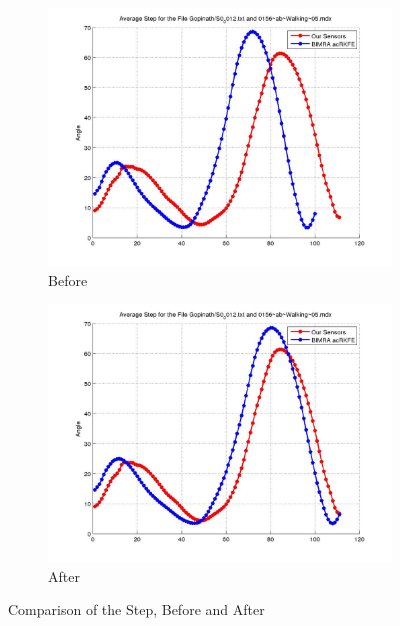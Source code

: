 \documentclass[12pt]{article}
\begin{document}
\begin{figure}[h]%

\begin{subfigure}[!htb]{2cm}
\hspace*{-2cm} \includegraphics[scale=.22]{S0_0012_before.jpg}
\caption{Before}
\end{subfigure}
\hfill\hfill
\begin{subfigure}[h]{0.4\textwidth}
\hspace*{-2cm} \includegraphics[scale=.22]{S0_0012_after.jpg}
\caption{After}
\end{subfigure}%

\caption[Hello]{Comparison of the Step, Before and After}
\end{figure}
\end{document}
